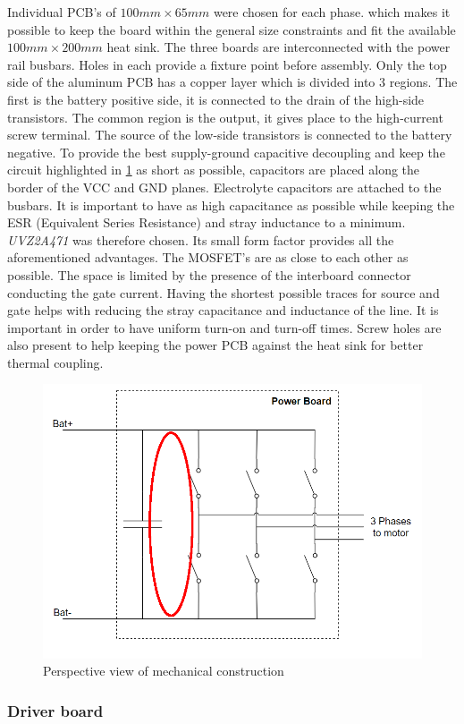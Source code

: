 Individual PCB's of $100mm \times 65mm$ were chosen for each phase. which makes it possible to keep the board within the general size constraints and fit the available $100mm \times 200mm$ heat sink. The three boards are interconnected with the power rail busbars. Holes in each provide a fixture point before assembly. Only the top side of the aluminum PCB has a copper layer which is divided into 3 regions. The first is the battery positive side, it is connected to the drain of the high-side transistors. The common region is the output, it gives place to the high-current screw terminal. The source of the low-side transistors is connected to the battery negative. To provide the best supply-ground capacitive decoupling and keep the circuit highlighted in \ref{fig:cap_circ} as short as possible, capacitors are placed along the border of the VCC and GND planes. Electrolyte capacitors are attached to the busbars. It is important to have as high capacitance as possible while keeping the ESR (Equivalent Series Resistance) and stray inductance to a minimum. \textit{UVZ2A471}\cite{elco} was therefore chosen. Its small form factor provides all the aforementioned advantages. The MOSFET's are as close to each other as possible. The space is limited by the presence of the interboard connector conducting the gate current. Having the shortest possible traces for source and gate helps with reducing the stray capacitance and inductance of the line. It is important in order to have uniform turn-on and turn-off times. Screw holes are also present to help keeping the power PCB against the heat sink for better thermal coupling.

\begin{figure}[H]
	\centering
	\includegraphics[width=1\textwidth]{pictures/hardware/Power_Board/Sketch_of_powerBoard_circulating.PNG}
	\caption{Perspective view of mechanical construction}
	\label{fig:cap_circ}
\end{figure}

\subsubsection{Driver board}


